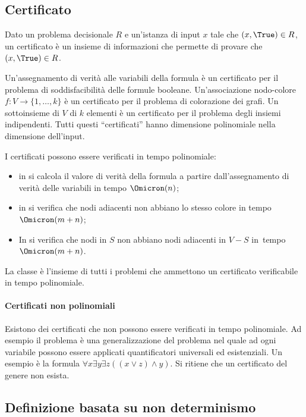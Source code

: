 \subsection{Certificato}

Dato un problema decisionale \(R\) e un'istanza di input \(x\) tale che \((x, \True) \in R\), un certificato è un insieme di informazioni che permette di provare che \((x, \True) \in R\).

Un'assegnamento di verità alle variabili della formula è un certificato per il problema di soddisfacibilità delle formule booleane.
Un'associazione nodo-colore \(f: V \to \{1, \dots, k\}\) è un certificato per il problema di colorazione dei grafi.
Un sottoinsieme di \(V\) di \(k\) elementi è un certificato per il problema degli insiemi indipendenti.
Tutti questi \enquote{certificati} hanno dimensione polinomiale nella dimensione dell'input.

I certificati possono essere verificati in tempo polinomiale:
\begin{itemize}
    \item in {\sat} si calcola il valore di verità della formula a partire dall'assegnamento di verità delle variabili in tempo \(\Omicron(n)\);
    \item in {\graphColoring} si verifica che nodi adiacenti non abbiano lo stesso colore in tempo \(\Omicron(m+n)\);
    \item In {\indipendentSet} si verifica che nodi in \(S\) non abbiano nodi adiacenti in \(V-S\) \mbox{in tempo \(\Omicron(m+n)\)}.
\end{itemize}

\begin{note}
La classe {\NP} è l'insieme di tutti i problemi che ammettono un certificato verificabile in tempo polinomiale.
\end{note}

\paragraph{Certificati non polinomiali}
Esistono dei certificati che non possono essere verificati in tempo polinomiale.
Ad esempio il problema  è una generalizzazione del problema {\sat} nel quale ad ogni variabile possono essere applicati quantificatori universali ed esistenziali.
Un esempio è la formula \(\forall x \exists y \exists z ((x \lor z) \land y)\).
Si ritiene che un certificato del genere non esista.

\subsection{Definizione basata su non determinismo}

